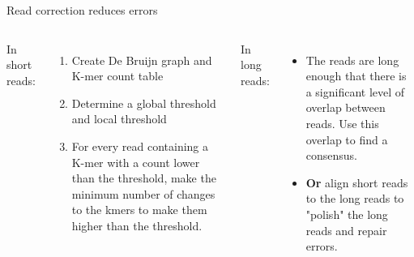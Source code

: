 \documentclass{beamer}
\begin{document}

\begin{frame}{Read correction reduces errors}
\begin{columns}
In short reads:
\begin{enumerate}
	\item Create De Bruijn graph and K-mer count table
	\item Determine a global threshold and local threshold
	\item For every read containing a K-mer with a count lower than the threshold, make the minimum number of changes to the kmers to make them higher than the threshold.
\end{enumerate}
In long reads:
\begin{itemize}
	\item The reads are long enough that there is a significant level of overlap between reads. Use this overlap to find a consensus.
	\item \textbf{Or} align short reads to the long reads to "polish" the long reads and repair errors.
\end{itemize}
\end{columns}
\end{frame}

\end{document}
